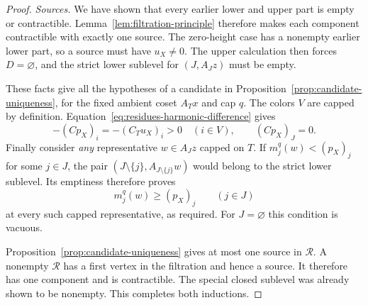 \begin{proof}
\medskip\noindent
\textit{Sources.}
We have shown that every earlier lower and upper part is empty or
contractible.  Lemma~\ref{lem:filtration-principle} therefore makes
each component contractible with exactly one source.  The zero-height
case has a nonempty earlier lower part, so a source must have
$u_X\ne0$.  The upper calculation then forces $D=\varnothing$,
and the strict lower sublevel for $(J,A_Jz)$ must be empty.

These facts give all the hypotheses of a candidate in
Proposition~\ref{prop:candidate-uniqueness}, for the fixed ambient
coset $A_Tx$ and cap $q$.  The colors $V$ are capped by definition.
Equation~\eqref{eq:residues-harmonic-difference} gives
\[
 -(Cp_X)_i=-(C_Tu_X)_i>0\quad(i\in V),
 \qquad (Cp_X)_J=0.
\]
Finally consider \emph{any} representative $w\in A_Jz$ capped on
$T$.  If $m_j^q(w)<(p_X)_j$ for some $j\in J$, the pair
$(J\setminus\{j\},A_{J\setminus\{j\}}w)$ would belong to the
strict lower sublevel.  Its emptiness therefore proves
\[
 m_j^q(w)\ge(p_X)_j\qquad(j\in J)
\]
at every such capped representative, as required.  For
$J=\varnothing$ this condition is vacuous.

Proposition~\ref{prop:candidate-uniqueness} gives at most one source
in $\mathcal R$.  A nonempty $\mathcal R$ has a first vertex in
the filtration and hence a source.  It therefore has one component
and is contractible.  The special closed sublevel was already shown
to be nonempty.  This completes both inductions.
\end{proof}
